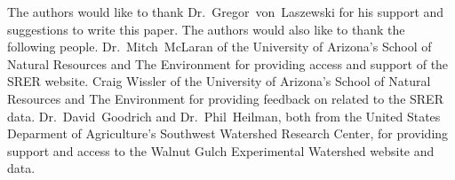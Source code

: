\begin{acks}
The authors would like to thank Dr.~Gregor~von~Laszewski for his support 
and suggestions to write this paper.  The authors would also like to thank 
the following people.  Dr.~Mitch~McLaran of the University of Arizona's School 
of Natural Resources and The Environment for providing access and support of 
the SRER website.  Craig Wissler of the University of Arizona's School of 
Natural Resources and The Environment for providing feedback on related to the 
SRER data.  Dr.~David~Goodrich and Dr.~Phil~Heilman, both from the United 
States Deparment of Agriculture's Southwest Watershed Research Center, for 
providing support and access to the Walnut Gulch Experimental Watershed 
website and data.
\end{acks}


 
